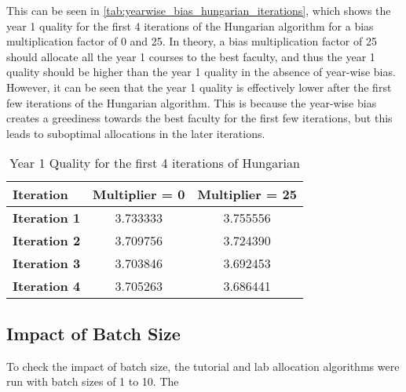 This can be seen in \autoref{tab:yearwise_bias_hungarian_iterations}, which shows the year 1 quality for the first 4 iterations of the Hungarian algorithm for a bias multiplication factor of 0 and 25. In theory, a bias multiplication factor of 25 should allocate all the year 1 courses to the best faculty, and thus the year 1 quality should be higher than the year 1 quality in the absence of year-wise bias. However, it can be seen that the year 1 quality is effectively lower after the first few iterations of the Hungarian algorithm. This is because the year-wise bias creates a greediness towards the best faculty for the first few iterations, but this leads to suboptimal allocations in the later iterations.

\begin{table}[H]
  \centering
  \begin{tabular}{|l|c|c|}
    \hline
    \textbf{Iteration}   & \textbf{Multiplier = 0} & \textbf{Multiplier = 25} \\ \hline
    \textbf{Iteration 1} & 3.733333                & 3.755556                 \\ \hline
    \textbf{Iteration 2} & 3.709756                & 3.724390                 \\ \hline
    \textbf{Iteration 3} & 3.703846                & 3.692453                 \\ \hline
    \textbf{Iteration 4} & 3.705263                & 3.686441                 \\ \hline
  \end{tabular}
  \caption{Year 1 Quality for the first 4 iterations of Hungarian}
  \label{tab:yearwise_bias_hungarian_iterations}
\end{table}

\subsection{Impact of Batch Size}

To check the impact of batch size, the tutorial and lab allocation algorithms were run with batch sizes of 1 to 10. The

